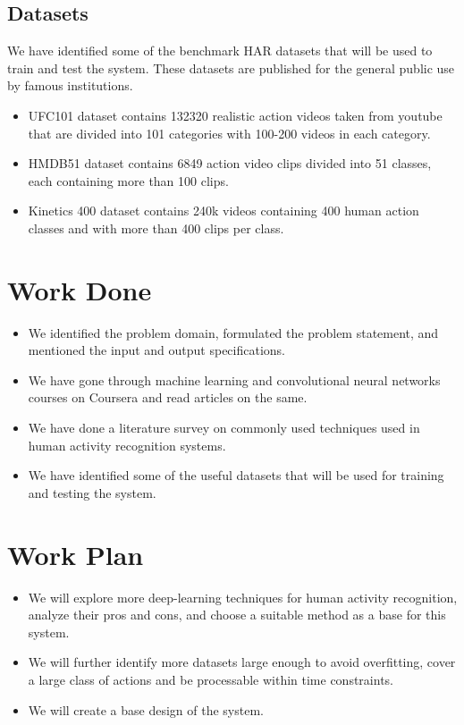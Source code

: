 \documentclass[twocolumn]{article}
\begin{document}
\subsection{Datasets}
We have identified some of the benchmark HAR datasets that will be used to train and test the system. These datasets are published for the general public use by famous
institutions.
\begin{itemize}
    \item \cite{b6} UFC101 dataset contains 132320 realistic action videos taken from youtube that are divided into 101 categories with 100-200 videos in each category.
    \item \cite{b7} HMDB51 dataset contains 6849 action video clips divided into 51 classes, each containing more than 100 clips.
    \item \cite{b8} Kinetics 400 dataset contains 240k videos containing 400 human action classes and with more than 400 clips per class.
\end{itemize}

\section{Work Done}
\begin{itemize}
    \item We identified the problem domain, formulated the problem statement, and mentioned the input and output specifications.
    \item We have gone through machine learning and convolutional neural networks courses on Coursera and read articles on the same.
    \item We have done a literature survey on commonly used techniques used in human activity recognition systems.
    \item We have identified some of the useful datasets that will be used for training and testing the system.
\end{itemize}

\section{Work Plan}
\begin{itemize}
    \item We will explore more deep-learning techniques for human activity recognition, analyze their pros and cons, and choose a suitable method as a base for this system.
    \item We will further identify more datasets large enough to avoid overfitting, cover a large class of actions and be processable within time constraints.
    \item We will create a base design of the system.
\end{itemize}
\end{document}
